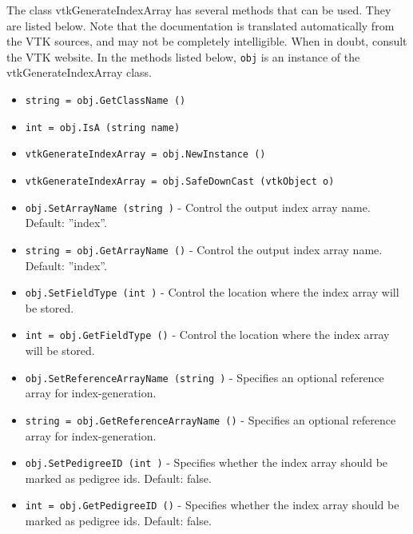 The class vtkGenerateIndexArray has several methods that can be used.
  They are listed below.
Note that the documentation is translated automatically from the VTK sources,
and may not be completely intelligible.  When in doubt, consult the VTK website.
In the methods listed below, \verb|obj| is an instance of the vtkGenerateIndexArray class.
\begin{itemize}
\item  \verb|string = obj.GetClassName ()|

\item  \verb|int = obj.IsA (string name)|

\item  \verb|vtkGenerateIndexArray = obj.NewInstance ()|

\item  \verb|vtkGenerateIndexArray = obj.SafeDownCast (vtkObject o)|

\item  \verb|obj.SetArrayName (string )| -  Control the output index array name.  Default: ''index''. 

\item  \verb|string = obj.GetArrayName ()| -  Control the output index array name.  Default: ''index''. 

\item  \verb|obj.SetFieldType (int )| -  Control the location where the index array will be stored.

\item  \verb|int = obj.GetFieldType ()| -  Control the location where the index array will be stored.

\item  \verb|obj.SetReferenceArrayName (string )| -  Specifies an optional reference array for index-generation.

\item  \verb|string = obj.GetReferenceArrayName ()| -  Specifies an optional reference array for index-generation.

\item  \verb|obj.SetPedigreeID (int )| -  Specifies whether the index array should be marked as
 pedigree ids.  Default: false.

\item  \verb|int = obj.GetPedigreeID ()| -  Specifies whether the index array should be marked as
 pedigree ids.  Default: false.

\end{itemize}
